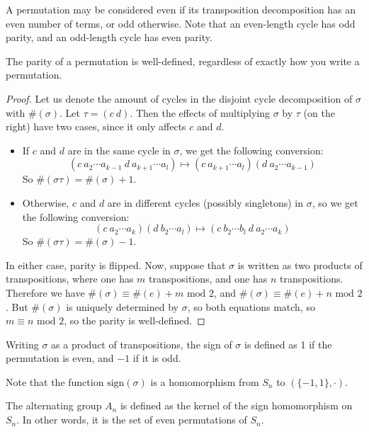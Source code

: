 A permutation may be considered even if its transposition decomposition has an even number of terms, or odd otherwise.
Note that an even-length cycle has odd parity, and an odd-length cycle has even parity.
\begin{proposition}
	The parity of a permutation is well-defined, regardless of exactly how you write a permutation.
\end{proposition}
\begin{proof}
	Let us denote the amount of cycles in the disjoint cycle decomposition of \(\sigma\) with \(\#(\sigma)\).
	Let \(\tau = (c\ d)\).
	Then the effects of multiplying \(\sigma\) by \(\tau\) (on the right) have two cases, since it only affects \(c\) and \(d\).
	\begin{itemize}
		\item If \(c\) and \(d\) are in the same cycle in \(\sigma\), we get the following conversion:
		      \[
			      (c\ a_2 \cdots a_{k-1}\ d\ a_{k+1} \cdots a_l) \mapsto (c\ a_{k+1} \cdots a_l) (d\ a_2 \cdots a_{k-1})
		      \]
		      So \(\#(\sigma\tau) = \#(\sigma) + 1\).
		\item Otherwise, \(c\) and \(d\) are in different cycles (possibly singletons) in \(\sigma\), so we get the following conversion:
		      \[
			      (c\ a_2 \cdots a_k) (d\ b_2 \cdots a_l) \mapsto (c\ b_2 \cdots b_l\ d\ a_2 \cdots a_k)
		      \]
		      So \(\#(\sigma\tau) = \#(\sigma) - 1\).
	\end{itemize}
	In either case, parity is flipped.
	Now, suppose that \(\sigma\) is written as two products of transpositions, where one has \(m\) transpositions, and one has \(n\) transpositions.
	Therefore we have \(\#(\sigma) \equiv \#(e) + m \text{ mod } 2\), and \(\#(\sigma) \equiv \#(e) + n \text{ mod } 2\).
	But \(\#(\sigma)\) is uniquely determined by \(\sigma\), so both equations match, so \(m \equiv n \text{ mod } 2\), so the parity is well-defined.
\end{proof}

\begin{definition}
	Writing \(\sigma\) as a product of transpositions, the sign of \(\sigma\) is defined as 1 if the permutation is even, and \(-1\) if it is odd.
\end{definition}
Note that the function \(\mathrm{sign}(\sigma)\) is a homomorphism from \(S_n\) to \((\{-1, 1\}, \cdot)\).

\begin{definition}
	The alternating group \(A_n\) is defined as the kernel of the sign homomorphism on \(S_n\).
	In other words, it is the set of even permutations of \(S_n\).
\end{definition}

